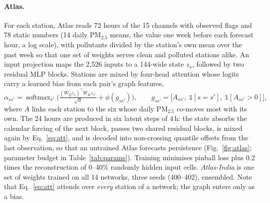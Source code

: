 \documentclass{article}
\newcommand{\pmtf}{PM$_{2.5}$}
\begin{document}
\paragraph{Atlas.} For each station, Atlas reads 72 hours of the 15 channels with observed flags and 78 static numbers
(14 daily \pmtf{} means, the value one week before each forecast hour, a log scale), with pollutants divided by the
station's own mean over the past week so that one set of weights serves clean and polluted stations alike. An input
projection maps the 2{,}526 inputs to a 144-wide state $z_s$, followed by two residual MLP blocks. Stations are mixed by
four-head attention whose logits carry a learned bias from each pair's graph features,
\begin{equation}
\alpha_{ss'} = \operatorname{softmax}_{s'}\!\Big(\tfrac{(W_Q z_s)^\top W_K z_{s'}}{\sqrt{d}} + \phi(g_{ss'})\Big),\qquad
g_{ss'} = \big[A_{ss'},\ \mathbb{1}[s{=}s'],\ \mathbb{1}[A_{ss'}{>}0]\big],
\label{eq:att}
\end{equation}
where $A$ links each station to the six whose daily \pmtf{} co-moves most with its own. The 24 hours are produced in six
latent steps of 4\,h: the state absorbs the calendar forcing of the next block, passes two shared residual blocks, is
mixed again by Eq.~\eqref{eq:att}, and is decoded into non-crossing quantile offsets from the last observation, so that
an untrained Atlas forecasts persistence (Fig.~\ref{fig:atlas}; parameter budget in Table~\ref{tab:params}). Training minimises pinball loss plus 0.2 times the
reconstruction of 0--40\% randomly hidden input cells. \emph{Atlas-India} is one set of weights trained on all 14
networks, three seeds (400--402), ensembled. Note that Eq.~\eqref{eq:att} attends over \emph{every} station of a network;
the graph enters only as a bias.
\end{document}
